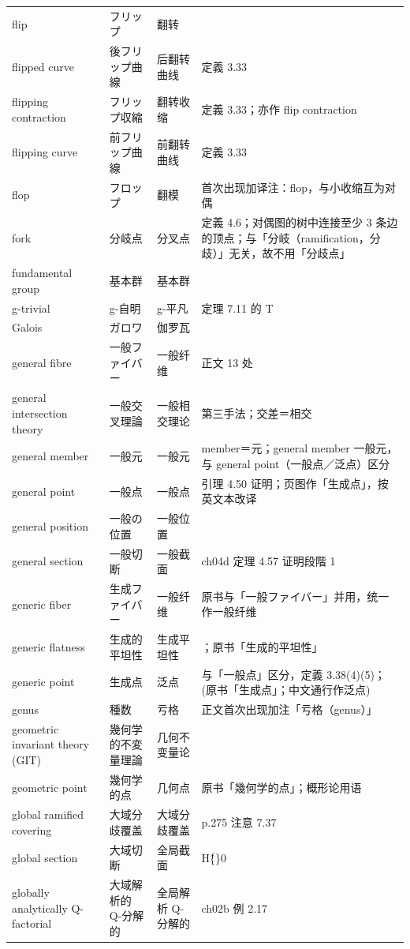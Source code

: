 \begin{longtable}{@{}>{\raggedright\arraybackslash}p{}>{\raggedright\arraybackslash}p{}>{\raggedright\arraybackslash}p{}>{\raggedright\arraybackslash}p{}@{}}
flip & フリップ & 翻转 &  \\
flipped curve & 後フリップ曲線 & 后翻转曲线 & 定義 3.33 \\
flipping contraction & フリップ収縮 & 翻转收缩 & 定義 3.33；亦作 flip contraction \\
flipping curve & 前フリップ曲線 & 前翻转曲线 & 定義 3.33 \\
flop & フロップ & 翻模 & 首次出现加译注：flop，与小收缩互为对偶 \\
fork & 分岐点 & 分叉点 & 定義 4.6；对偶图的树中连接至少 3 条边的顶点；与「分岐（ramification，分歧）」无关，故不用「分歧点」 \\
fundamental group & 基本群 & 基本群 &  \\
g-trivial & g-自明 & g-平凡 & 定理 7.11 的 T \\
Galois & ガロワ & 伽罗瓦 &  \\
general fibre & 一般ファイバー & 一般纤维 & 正文 13 处 \\
general intersection theory & 一般交叉理論 & 一般相交理论 & 1.34 第三手法；交差＝相交 \\
general member & 一般元 & 一般元 & member＝元；general member 一般元，与 general point（一般点／泛点）区分 \\
general point & 一般点 & 一般点 & 引理 4.50 证明；页图作「生成点」，按英文本改译 \\
general position & 一般の位置 & 一般位置 &  \\
general section & 一般切断 & 一般截面 & ch04d 定理 4.57 证明段階 1 \\
generic fiber & 生成ファイバー & 一般纤维 & 原书与「一般ファイバー」并用，统一作一般纤维 \\
generic flatness & 生成的平坦性 & 生成平坦性 & [Mat69, Thm. 52]；原书「生成的平坦性」 \\
generic point & 生成点 & 泛点 & 与「一般点」区分，定義 3.38(4)(5)；(原书「生成点」；中文通行作泛点) \\
genus & 種数 & 亏格 & 正文首次出现加注「亏格（genus）」 \\
geometric invariant theory (GIT) & 幾何学的不変量理論 & 几何不变量论 & 7.72 \\
geometric point & 幾何学的点 & 几何点 & 原书「幾何学的点」；概形论用语 \\
global ramified covering & 大域分歧覆盖 & 大域分歧覆盖 & p.275 注意 7.37 \\
global section & 大域切断 & 全局截面 & H\^\{\}0 \\
globally analytically Q-factorial & 大域解析的 Q-分解的 & 全局解析 Q-分解的 & ch02b 例 2.17 \\

\end{longtable}
